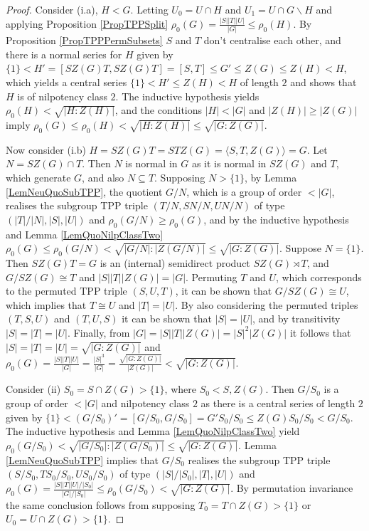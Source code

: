 \documentclass{amsart}
\theoremstyle{observation}
\theoremstyle{definition}
\theoremstyle{remark}
\numberwithin{equation}{section}
\begin{document}
\begin{proof}
Consider \textup{(i.a)}, $H < G$. Letting $U_0 = U \cap H$ and $U_1 = U \cap G\backslash H$ and applying Proposition \ref{PropTPPSplit} $\rho_0(G) = \frac{|S||T||U|}{|G|} \leq \rho_0(H)$. By Proposition \ref{PropTPPPermSubsets} $S$ and $T$ don't centralise each other, and there is a normal series for $H$ given by $\{1\} < H' = [SZ(G)T, SZ(G)T] = [S, T] \leq G' \leq Z(G) \leq Z(H) < H$, which yields a central series $\{1\} < H' \leq Z(H) < H$ of length $2$ and shows that $H$ is of nilpotency class $2$. The inductive hypothesis yields $\rho_0(H) < \sqrt{|H:Z(H)|}$, and the conditions $|H| < |G|$ and $|Z(H)| \geq |Z(G)|$ imply $\rho_0(G) \leq \rho_0(H) < \sqrt{|H:Z(H)|} \leq \sqrt{|G:Z(G)|}$.

\vspace{1mm}

Now consider \textup{(i.b)} $H = SZ(G)T = STZ(G) = \langle S, T, Z(G) \rangle = G$. Let $N = SZ(G) \cap T$. Then $N$ is normal in $G$ as it is normal in $SZ(G)$ and $T$, which generate $G$, and also $N \subseteq T$. Supposing $N > \{1\}$, by Lemma \ref{LemNeuQuoSubTPP}, the quotient $G/N$, which is a group of order $< |G|$, realises the subgroup TPP triple $(T/N,SN/N, UN/N)$ of type $(|T|/|N|,|S|,|U|)$ and $\rho_0(G/N) \geq \rho_0(G)$, and by the inductive hypothesis and Lemma \ref{LemQuoNilpClassTwo} $\rho_0(G) \leq \rho_0(G/N) < \sqrt{|G/N|:|Z(G/N)|} \leq \sqrt{|G:Z(G)|}$. Suppose $N = \{1\}$. Then $SZ(G)T = G$ is an (internal) semidirect product $SZ(G) \rtimes T$, and $G/SZ(G) \cong T$ and $|S||T||Z(G)| = |G|$. Permuting $T$ and $U$, which corresponds to the permuted TPP triple $(S, U, T)$, it can be shown that $G/SZ(G) \cong U$, which implies that $T \cong U$ and $|T| = |U|$. By also considering the permuted triples $(T, S, U)$ and $(T, U, S)$ it can be shown that $|S| = |U|$, and by transitivity $|S| = |T| = |U|$. Finally, from $|G| = |S||T||Z(G)| = |S|^2|Z(G)|$ it follows that $|S| = |T| = |U| = \sqrt{|G:Z(G)|}$ and $\rho_0(G) = \frac{|S||T||U|}{|G|} = \frac{|S|^3}{|G|} = \frac{\sqrt{|G:Z(G)|}}{|Z(G)|} < \sqrt{|G:Z(G)|}$.

\vspace{1mm}

Consider \textup{(ii)} $S_0 = S \cap Z(G) > \{1\}$, where $S_0 < S, Z(G)$. Then $G/S_0$ is a group of order $< |G|$ and nilpotency class $2$ as there is a central series of length $2$ given by $\{1\} < (G/S_0)' = [G/S_0, G/S_0] = G'S_0/S_0 \leq Z(G)S_0/S_0 < G/S_0$. The inductive hypothesis and Lemma \ref{LemQuoNilpClassTwo} yield $\rho_0(G/S_0) < \sqrt{|G/S_0|:|Z(G/S_0)|} \leq \sqrt{|G:Z(G)|}$. Lemma \ref{LemNeuQuoSubTPP} implies that $G/S_0$ realises the subgroup TPP triple $(S/S_0, TS_0/S_0, US_0/S_0)$ of type $(|S|/|S_0|,|T|,|U|)$ and $\rho_0(G) = \frac{|S||T||U|/|S_0|}{|G|/|S_0|} \leq \rho_0(G/S_0) < \sqrt{|G:Z(G)|}$. By permutation invariance the same conclusion follows from supposing $T_0 = T \cap Z(G) > \{1\}$ or $U_0 = U \cap Z(G) > \{1\}$.

\end{proof}
\end{document}
